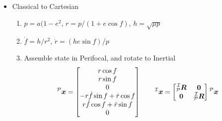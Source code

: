 \documentclass[twocolumn]{article}    %
\begin{document}
\begin{itemize}
    \item Classical to Cartesian
    \begin{enumerate}
        \item \(p = a(1-e^2\), \(r= p/(1+e\cos f)\), \(h = \sqrt{\mu p}\)
        \item \(\dot{f} = h/r^2\), \(\dot{r} = (h e \sin f) /p\)
        \item Assemble state in Perifocal, and rotate to Inertial
        \begin{equation*}
            \prescript{\mathcal{P}}{}{\bm{x}} = \begin{bmatrix}
                r \cos f \\ r \sin f \\ 0\\ 
                -r \dot{f} \sin f + \dot{r} \cos f \\
                r \dot{f} \cos f + \dot{r} \sin f\\
                0
            \end{bmatrix} \hspace{20pt} \prescript{\mathcal{I}}{}{\bm{x}} = \begin{bmatrix}
                \prescript{\mathcal{I}}{\mathcal{P}}{\bm{R}} & \bm{0}\\ \bm{0} & \prescript{\mathcal{I}}{\mathcal{P}}{\bm{R}}
            \end{bmatrix} \prescript{\mathcal{P}}{}{\bm{x}}
        \end{equation*}
    \end{enumerate}
\end{itemize}

\end{document}
